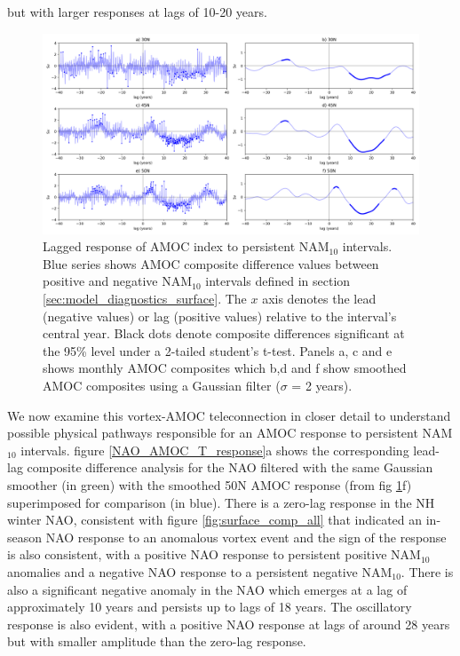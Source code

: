 \citep{reichlerStratospheric2012} but with larger responses at lags of 10-20 years.

\begin{center}
\begin{figure}[h!]
\noindent\includegraphics[width = \linewidth]{Figures/Figures-surface/AMOC_responses_low_and_highf_combined.png} 
\caption{Lagged response of AMOC index to persistent NAM$_{10}$ intervals. Blue series shows AMOC composite difference values between positive and negative NAM$_{10}$ intervals defined in section \ref{sec:model_diagnostics_surface}. The $x$ axis denotes the lead (negative values) or lag (positive values) relative to the interval's central year. Black dots denote composite differences significant at the 95\% level under a 2-tailed student's t-test. Panels a, c and e shows monthly AMOC composites which b,d and f show smoothed AMOC composites using a Gaussian filter ($\sigma$ = 2 years).}
\label{AMOC_comp_NAM}
\end{figure}
\end{center}

We now examine this vortex-AMOC teleconnection in closer detail to understand possible physical pathways responsible for an AMOC response to persistent NAM$_{10}$ intervals. figure \ref{NAO_AMOC_T_response}a shows the corresponding lead-lag composite difference analysis for the NAO filtered with the same Gaussian smoother (in green) with the smoothed 50N AMOC response (from fig \ref{AMOC_comp_NAM}f) superimposed for comparison (in blue). There is a zero-lag response in the NH winter NAO, consistent with figure \ref{fig:surface_comp_all} that indicated an in-season NAO response to an anomalous vortex event and the sign of the response is also consistent, with a positive NAO response to persistent positive NAM$_{10}$ anomalies and a negative NAO response to a persistent negative NAM$_{10}$.  There is also a significant negative anomaly in the NAO which emerges at a lag of approximately 10 years and persists up to lags of 18 years. The oscillatory response is also evident, with a positive NAO response at lags of around 28 years but with smaller amplitude than the zero-lag response. 

